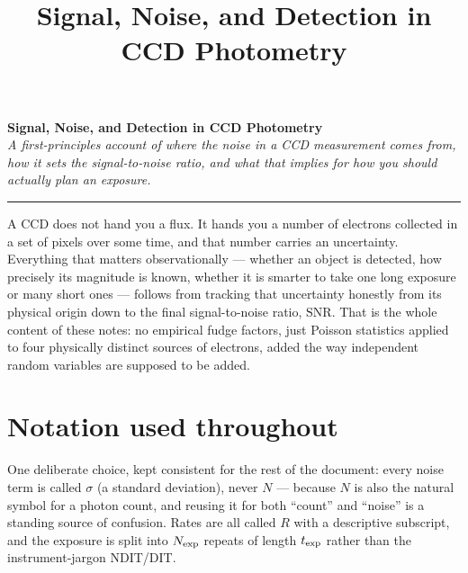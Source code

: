 \documentclass[11pt]{article}
\title{\bfseries Signal, Noise, and Detection in CCD Photometry}
\author{}
\date{}
\begin{document}
\begin{center}
{\LARGE\bfseries Signal, Noise, and Detection in CCD Photometry}\\[6pt]
{\itshape\color{muted} A first-principles account of where the noise in a CCD measurement comes from,
how it sets the signal-to-noise ratio, and what that implies for how you should actually plan an exposure.}
\end{center}
\vspace{4pt}
\hrule
\vspace{14pt}

A CCD does not hand you a flux. It hands you a number of electrons collected in a set of pixels over
some time, and that number carries an uncertainty. Everything that matters observationally --- whether
an object is detected, how precisely its magnitude is known, whether it is smarter to take one long
exposure or many short ones --- follows from tracking that uncertainty honestly from its physical
origin down to the final signal-to-noise ratio, $\mathrm{SNR}$. That is the whole content of these
notes: no empirical fudge factors, just Poisson statistics applied to four physically distinct sources
of electrons, added the way independent random variables are supposed to be added.

\section*{Notation used throughout}

One deliberate choice, kept consistent for the rest of the document: every noise term is called
$\sigma$ (a standard deviation), never $N$ --- because $N$ is also the natural symbol for a photon
count, and reusing it for both ``count'' and ``noise'' is a standing source of confusion. Rates are
all called $R$ with a descriptive subscript, and the exposure is split into $N_{\rm exp}$ repeats of
length $t_{\rm exp}$ rather than the instrument-jargon NDIT/DIT.
\end{document}
